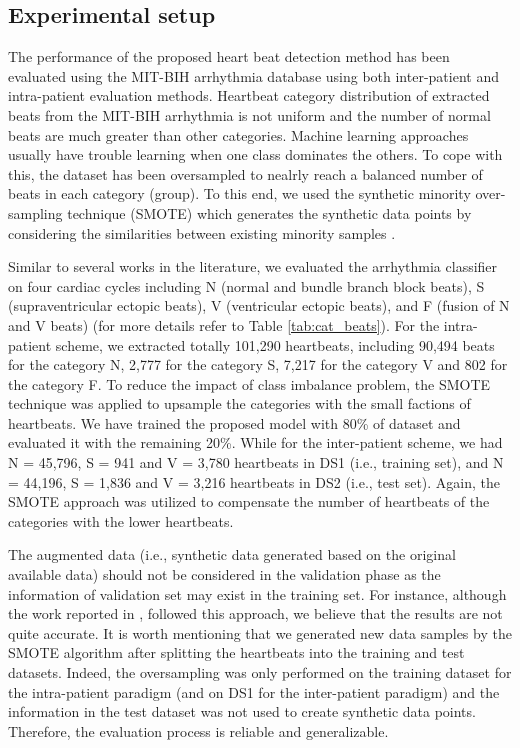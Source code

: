 \documentclass{article}
\begin{document}
\subsection{Experimental setup}
\label{sec:setup}
The performance of the proposed heart beat detection method has been evaluated using the MIT-BIH arrhythmia database using both inter-patient and intra-patient evaluation methods. Heartbeat category distribution of extracted beats from the MIT-BIH arrhythmia is not uniform and the number of normal beats are much greater than other categories. Machine learning approaches usually have trouble learning when one class dominates the others. To cope with this, the dataset has been oversampled to nealrly reach a balanced number of beats in each category (group). To this end, we used the synthetic minority over-sampling technique (SMOTE) which generates the synthetic data points by considering the similarities between existing minority samples \cite{chawla2002smote}.

Similar to several works in the literature, we evaluated the arrhythmia classifier on four cardiac cycles including N (normal and bundle branch block beats), S (supraventricular ectopic beats), V (ventricular ectopic beats),  and F (fusion of N and V beats) (for more details refer to Table \ref{tab:cat_beats}).
For the intra-patient scheme, we extracted totally 101,290 heartbeats, including 90,494 beats for the category N, 2,777 for the category S, 7,217 for the category V and 802 for the category F. 
To reduce the impact of class imbalance problem, the SMOTE technique was applied to upsample the categories with the small factions of heartbeats. We have trained the proposed model with 80\% of dataset and evaluated it with the remaining 20\%. 
While for the inter-patient scheme, we had N = 45,796, S = 941 and V = 3,780 heartbeats in DS1 (i.e., training set), and N = 44,196, S = 1,836 and V = 3,216 heartbeats in DS2 (i.e., test set). 
Again,  the SMOTE approach was utilized to compensate the number of heartbeats of the categories with the lower heartbeats. 

The augmented data (i.e., synthetic data generated based on the original available data) should not be  considered in the validation phase as the information of validation set may exist in the training set. For instance, although the work reported in \cite{acharya2017deep}, followed this approach, we believe that the results are not quite accurate. 
It is worth mentioning that we generated new data samples by the SMOTE algorithm after splitting the heartbeats into the training and test datasets. Indeed, the oversampling was only performed on the training dataset for the intra-patient paradigm (and on DS1 for the inter-patient paradigm) and the information in the test dataset was not used to create synthetic data points. Therefore, the evaluation process is reliable and generalizable.
\end{document}
